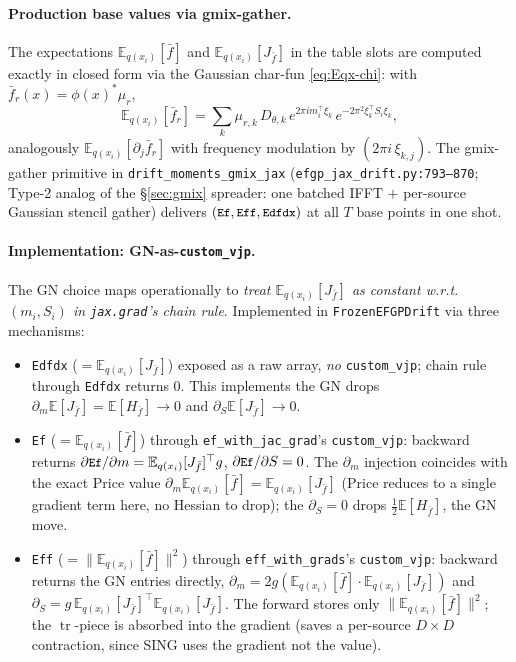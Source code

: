 \documentclass[11pt]{article}
\newcommand{\E}{\mathbb{E}}
\newcommand{\Eqx}{\mathbb{E}_{q(x_i)}}
\newcommand{\tr}{\operatorname{tr}}
\newcommand{\code}[1]{\texttt{\small #1}}
\begin{document}
\paragraph{Production base values via gmix-gather.}
The expectations $\Eqx[\bar f]$ and $\Eqx[J_{\bar f}]$ in the table
slots are computed exactly in closed form via the Gaussian char-fun
\eqref{eq:Eqx-chi}: with $\bar f_r(x) = \phi(x)^* \mu_r$,
\[
\Eqx[\bar f_r] = \sum_k \mu_{r,k}\,D_{\theta,k}\,e^{2\pi i m_i^\top \xi_k}\,e^{-2\pi^2 \xi_k^\top S_i \xi_k},
\]
analogously $\Eqx[\partial_j\bar f_r]$ with frequency modulation by
$(2\pi i\,\xi_{k,j})$. The gmix-gather primitive in
\code{drift\_moments\_gmix\_jax} (\code{efgp\_jax\_drift.py:793--870};
Type-2 analog of the §\ref{sec:gmix} spreader: one batched IFFT $+$
per-source Gaussian stencil gather) delivers
$(\code{Ef}, \code{Eff}, \code{Edfdx})$ at all $T$ base points in one
shot.

\paragraph{Implementation: GN-as-\code{custom\_vjp}.}
The GN choice maps operationally to \emph{treat $\Eqx[J_{\bar f}]$ as
constant w.r.t.\ $(m_i, S_i)$ in \code{jax.grad}'s chain rule}.
Implemented in \code{FrozenEFGPDrift} via three mechanisms:
\begin{itemize}\setlength\itemsep{2pt}
\item \code{Edfdx} ($=\Eqx[J_{\bar f}]$) exposed as a raw array,
  \emph{no} \code{custom\_vjp}; chain rule through \code{Edfdx}
  returns 0. This implements the GN drops
  $\partial_m\E[J_{\bar f}] = \E[H_{\bar f}] \to 0$ and
  $\partial_S\E[J_{\bar f}] \to 0$.
\item \code{Ef} ($=\Eqx[\bar f]$) through \code{ef\_with\_jac\_grad}'s
  \code{custom\_vjp}: backward returns $\partial \code{Ef}/\partial m
  = \Eqx[J_{\bar f}]^\top g$, $\partial \code{Ef}/\partial S = 0$. The
  $\partial_m$ injection coincides with the exact Price value
  $\partial_m\Eqx[\bar f] = \Eqx[J_{\bar f}]$ (Price reduces to a
  single gradient term here, no Hessian to drop); the $\partial_S = 0$
  drops $\frac{1}{2}\E[H_{\bar f}]$, the GN move.
\item \code{Eff} ($= \|\Eqx[\bar f]\|^2$) through
  \code{eff\_with\_grads}'s \code{custom\_vjp}: backward returns the
  GN entries directly, $\partial_m = 2g(\Eqx[\bar f]\cdot\Eqx[J_{\bar f}])$
  and $\partial_S = g\,\Eqx[J_{\bar f}]^\top\Eqx[J_{\bar f}]$. The
  forward stores only $\|\Eqx[\bar f]\|^2$; the $\tr$-piece is
  absorbed into the gradient (saves a per-source $D\times D$
  contraction, since SING uses the gradient not the value).
\end{itemize}
\end{document}
